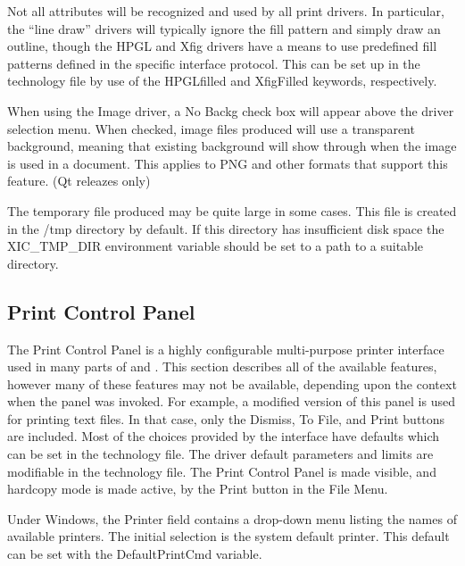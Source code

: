 Not all attributes will be recognized and used by all print drivers. 
In particular, the ``line draw'' drivers will typically ignore the
fill pattern and simply draw an outline, though the HPGL and Xfig
drivers have a means to use predefined fill patterns defined in the
specific interface protocol.  This can be set up in the technology
file by use of the {\vt HPGLfilled} and {\vt XfigFilled} keywords,
respectively.

When using the Image driver, a {\cb No Backg} check box will appear
above the driver selection menu.  When checked, image files produced
will use a transparent background, meaning that existing background
will show through when the image is used in a document.  This
applies to PNG and other formats that support this feature.
(Qt releazes only)

The temporary file produced may be quite large in some cases.  This
file is created in the {\vt /tmp} directory by default.  If this
directory has insufficient disk space the {\et XIC\_TMP\_DIR}
environment variable should be set to a path to a suitable directory.


\subsection{Print Control Panel}

The {\cb Print Control Panel} is a highly configurable multi-purpose
printer interface used in many parts of {\Xic} and {\WRspice}.  This
section describes all of the available features, however many of these
features may not be available, depending upon the context when the
panel was invoked.  For example, a modified version of this panel is
used for printing text files.  In that case, only the {\cb Dismiss},
{\cb To File}, and {\cb Print} buttons are included.  Most of the
choices provided by the interface have defaults which can be set in
the technology file.  The driver default parameters and limits are
modifiable in the technology file.  The {\cb Print Control Panel} is
made visible, and hardcopy mode is made active, by the {\cb Print}
button in the {\cb File Menu}.

Under Windows, the {\cb Printer} field contains a drop-down menu
listing the names of available printers.  The initial selection is the
system default printer.  This default can be set with the {\et
DefaultPrintCmd} variable.

